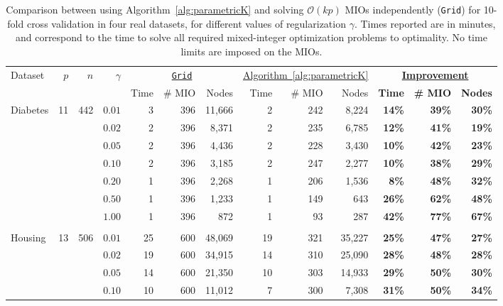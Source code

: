 \documentclass[ijoc,noblindrev]{informs3} %
\begin{document}
	\begin{table}[h!]\footnotesize
    \begin{center}
 \caption{Comparison between using Algorithm~\ref{alg:parametricK} and solving $\mathcal{O}(kp)$ MIOs independently (\texttt{Grid}) for 10-fold cross validation in four real datasets, for different values of regularization $\gamma$. Times reported are in minutes, and correspond to the time to solve all required mixed-integer optimization problems to optimality. No time limits are imposed on the MIOs.}
 \label{tab:gridVsAlg10}
	\setlength{\tabcolsep}{2pt}
	\begin{tabular}{l r r r|r r r | r r r  | r r r }
		
		\hline
		\multirow{2}{*}{Dataset}&\multirow{2}{*}{$p$}&\multirow{2}{*}{$n$}&\multirow{2}{*}{$\gamma$}& \multicolumn{3}{c|}{\underline{\texttt{Grid}}}&\multicolumn{3}{c|}{\underline{Algorithm~\ref{alg:parametricK}}}&\multicolumn{3}{c}{\textbf{\underline{Improvement}}}\\
		&&&&Time&\# MIO&Nodes&Time&\# MIO&Nodes&\textbf{Time}&\textbf{\# MIO}&\textbf{Nodes}\\
		\hline
			\multirow{7}{*}{Diabetes}&\multirow{7}{*}{11}&\multirow{7}{*}{442}&
		$0.01$&3&396&11,666&2&242&8,224&\textbf{14\%}&\textbf{39\%}&\textbf{30\%}\\
		&&&$0.02$&2&396&8,371&2&235&6,785&\textbf{12\%}&\textbf{41\%}&\textbf{19\%}\\
		&&&$0.05$&2&396&4,436&2&228&3,430&\textbf{10\%}&\textbf{42\%}&\textbf{23\%}\\
		&&&$0.10$&2&396&3,185&2&247&2,277&\textbf{10\%}&\textbf{38\%}&\textbf{29\%}\\
		&&&$0.20$&1&396&2,268&1&206&1,536&\textbf{8\%}&\textbf{48\%}&\textbf{32\%}\\
		&&&$0.50$&1&396&1,233&1&149&643&\textbf{26\%}&\textbf{62\%}&\textbf{48\%}\\
		&&&$1.00$&1&396&872&1&93&287&\textbf{42\%}&\textbf{77\%}&\textbf{67\%}\\
		&&&&&&&&&&&&\\
		\multirow{7}{*}{Housing}&\multirow{7}{*}{13}&\multirow{7}{*}{506}&
		$0.01$&25&600&48,069&19&321&35,227&\textbf{25\%}&\textbf{47\%}&\textbf{27\%}\\
		&&&$0.02$&19&600&34,915&14&310&25,090&\textbf{28\%}&\textbf{48\%}&\textbf{28\%}\\
		&&&$0.05$&14&600&21,350&10&303&14,933&\textbf{29\%}&\textbf{50\%}&\textbf{30\%}\\
		&&&$0.10$&10&600&11,012&7&300&7,308&\textbf{31\%}&\textbf{50\%}&\textbf{34\%}\\

\end{tabular}
\end{center}
\end{table}
\end{document}
